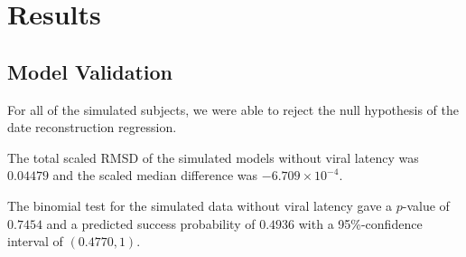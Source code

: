\documentclass[12pt]{article}
\begin{document}


\section * {Results} \label{sec:results}


\subsection * {Model Validation} \label{sec:sim_results}
For all of the simulated subjects, we were able to reject the null hypothesis of the date reconstruction regression. 

The total scaled RMSD of the simulated models without viral latency was $0.04479$ and the scaled median difference was $-6.709 \times{} 10^{-4}$.

The {binomial test} for the simulated data without viral latency gave a $p$-value of $0.7454$ and a predicted success probability of $0.4936$ with a 95\%-confidence interval of $(0.4770, 1)$.

\end{document}
